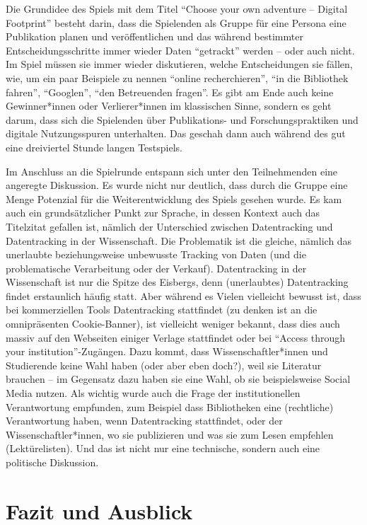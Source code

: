 \documentclass[a4paper,
fontsize=11pt,
oneside,
numbers=noperiodatend,
parskip=half-,
bibliography=totoc,
final
]{scrartcl}
\begin{document}
Die Grundidee des Spiels mit dem Titel \enquote{Choose your own
adventure -- Digital Footprint} besteht darin, dass die Spielenden als
Gruppe für eine Persona eine Publikation planen und veröffentlichen und
das während bestimmter Entscheidungsschritte immer wieder Daten
\enquote{getrackt} werden -- oder auch nicht. Im Spiel müssen sie immer
wieder diskutieren, welche Entscheidungen sie fällen, wie, um ein paar
Beispiele zu nennen \enquote{online recherchieren}, \enquote{in die
Bibliothek fahren}, \enquote{Googlen}, \enquote{den Betreuenden fragen}.
Es gibt am Ende auch keine Gewinner*innen oder Verlierer*innen im
klassischen Sinne, sondern es geht darum, dass sich die Spielenden über
Publikations- und Forschungspraktiken und digitale Nutzungsspuren
unterhalten. Das geschah dann auch während des gut eine dreiviertel
Stunde langen Testspiels.

Im Anschluss an die Spielrunde entspann sich unter den Teilnehmenden
eine angeregte Diskussion. Es wurde nicht nur deutlich, dass durch die
Gruppe eine Menge Potenzial für die Weiterentwicklung des Spiels gesehen
wurde. Es kam auch ein grundsätzlicher Punkt zur Sprache, in dessen
Kontext auch das Titelzitat gefallen ist, nämlich der Unterschied
zwischen Datentracking und Datentracking in der Wissenschaft. Die
Problematik ist die gleiche, nämlich das unerlaubte beziehungsweise
unbewusste Tracking von Daten (und die problematische Verarbeitung oder
der Verkauf). Datentracking in der Wissenschaft ist nur die Spitze des
Eisbergs, denn (unerlaubtes) Datentracking findet erstaunlich häufig
statt. Aber während es Vielen vielleicht bewusst ist, dass bei
kommerziellen Tools Datentracking stattfindet (zu denken ist an die
omnipräsenten Cookie-Banner), ist vielleicht weniger bekannt, dass dies
auch massiv auf den Webseiten einiger Verlage stattfindet oder bei
\enquote{Access through your institution}-Zugängen. Dazu kommt, dass
Wissenschaftler*innen und Studierende keine Wahl haben (oder aber eben
doch?), weil sie Literatur brauchen -- im Gegensatz dazu haben sie eine
Wahl, ob sie beispielsweise Social Media nutzen. Als wichtig wurde auch
die Frage der institutionellen Verantwortung empfunden, zum Beispiel
dass Bibliotheken eine (rechtliche) Verantwortung haben, wenn
Datentracking stattfindet, oder der Wissenschaftler*innen, wo sie
publizieren und was sie zum Lesen empfehlen (Lektürelisten). Und das ist
nicht nur eine technische, sondern auch eine politische Diskussion.

\section{Fazit und Ausblick}\label{fazit-und-ausblick}
\end{document}
